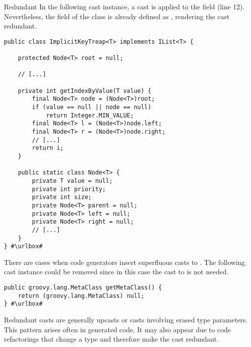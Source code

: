 \begin{pattern}{Redundant}
In the following cast instance,%
\def\urlvar{http://bit.ly/phishman3579_java_algorithms_implementation_2SGcH6w}
a cast is applied to the  field (line 12).
Nevertheless, the  field of the  class is already defined as ,
rendering the cast redundant.

\begin{verbatim}
public class ImplicitKeyTreap<T> implements IList<T> {

    protected Node<T> root = null;

    // [...]

    private int getIndexByValue(T value) {
        final Node<T> node = (Node<T>)root;
        if (value == null || node == null)
            return Integer.MIN_VALUE;
        final Node<T> l = (Node<T>)node.left;
        final Node<T> r = (Node<T>)node.right;
        // [...]
        return i;
    }

    public static class Node<T> {
        private T value = null;
        private int priority;
        private int size;
        private Node<T> parent = null;
        private Node<T> left = null;
        private Node<T> right = null;
        // [...]
    }
} #\urlbox#
\end{verbatim}

There are cases when code generators insert superfluous casts to .
The following cast instance%
\def\urlvar{http://bit.ly/togglz_togglz_2SGncXB}
could be removed since in this case the cast to  is not needed.

\begin{verbatim}
public groovy.lang.MetaClass getMetaClass() {
    return (groovy.lang.MetaClass) null;
} #\urlbox#
\end{verbatim}


\issues{}
Redundant casts are generally upcasts or casts involving erased type parameters.
  This pattern arises often in generated code.
  It may also appear 
due to code refactorings that change a type and therefore make the cast
  redundant.

    
\end{pattern}
